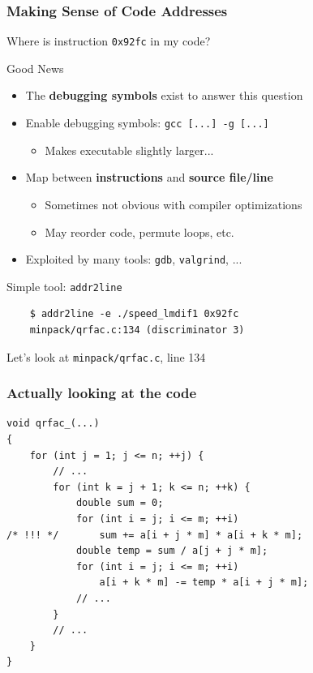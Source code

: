\documentclass[xcolor={x11names,svgnames}]{beamer}
\begin{document}
\begin{frame}[fragile]
  \frametitle{Making Sense of Code Addresses}

  Where is instruction \texttt{0x92fc} in my code?

  \begin{exampleblock}{Good News}
    \begin{itemize}
    \item The \textbf{debugging symbols} exist to answer this question
    \item Enable debugging symbols: \texttt{gcc [...] -g [...]}
      \begin{itemize}
      \item Makes executable slightly larger...
      \end{itemize}
    \item Map between \textbf{instructions} and \textbf{source file/line}
      \begin{itemize}
      \item Sometimes not obvious with compiler optimizations
      \item May reorder code, permute loops, etc. 
      \end{itemize}
    \item Exploited by many tools: \texttt{gdb}, \texttt{valgrind}, ...
    \end{itemize}
  \end{exampleblock}

  \begin{block}{Simple tool: \texttt{addr2line}}
    \begin{verbatim}
    $ addr2line -e ./speed_lmdif1 0x92fc
    minpack/qrfac.c:134 (discriminator 3)
\end{verbatim}
    Let's look at \texttt{minpack/qrfac.c}, line 134
  \end{block}  
\end{frame}


\begin{frame}[fragile]
  \frametitle{Actually looking at the code}

  \begin{verbatim}
void qrfac_(...)
{
    for (int j = 1; j <= n; ++j) {
        // ...     
        for (int k = j + 1; k <= n; ++k) {
            double sum = 0;
            for (int i = j; i <= m; ++i)
/* !!! */       sum += a[i + j * m] * a[i + k * m];
            double temp = sum / a[j + j * m];
            for (int i = j; i <= m; ++i)
                a[i + k * m] -= temp * a[i + j * m];
            // ...
        }
        // ...  
    }
}
\end{verbatim}
\end{frame}
\end{document}
